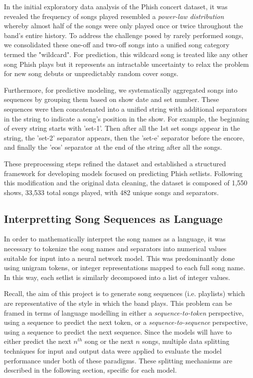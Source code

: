 \documentclass{article}
\begin{document}
In the initial exploratory data analysis of the Phish concert dataset, it was revealed the frequency of songs played resembled a \emph{power-law distribution} whereby almost half of the songs were only played once or twice throughout the band's entire history. To address the challenge posed by rarely performed songs, we consolidated these one-off and two-off songs into a unified song category termed the "wildcard". For prediction, this wildcard song is treated like any other song Phish plays but it represents an intractable uncertainty to relax the problem for new song debuts or unpredictably random cover songs. 

Furthermore, for predictive modeling, we systematically aggregated songs into sequences by grouping them based on show date and set number. These sequences were then concatenated into a unified string with additional separators in the string to indicate a song's position in the show. For example, the beginning of every string starts with 'set-1'. Then after all the 1st set songs appear in the string, the 'set-2' separator appears, then the 'set-e' separator before the encore, and finally the 'eos' separator at the end of the string after all the songs. 

These preprocessing steps refined the dataset and established a structured framework for developing models focused on predicting Phish setlists. Following this modification and the original data cleaning, the dataset is composed of 1,550 shows, 33,533 total songs played, with 482 unique songs and separators.

\subsection{Interpretting Song Sequences as Language}

In order to mathematically interpret the song names as a language, it was necessary to tokenize the song names and separators into numerical values suitable for input into a neural network model. This was predominantly done using unigram tokens, or integer representations mapped to each full song name. In this way, each setlist is similarly decomposed into a list of integer values. 

Recall, the aim of this project is to generate song sequences (i.e. playlists) which are representative of the style in which the band plays. This problem can be framed in terms of language modelling in either a {\it sequence-to-token} perspective, using a sequence to predict the next token, or a {\it sequence-to-sequence} perspective, using a sequence to predict the next sequence. Since the models will have to either predict the next $n^{th}$ song or the next $n$ songs, multiple data splitting techniques for input and output data were applied to evaluate the model performance under both of these paradigms. These splitting mechanisms are described in the following section, specific for each model. 
\end{document}
